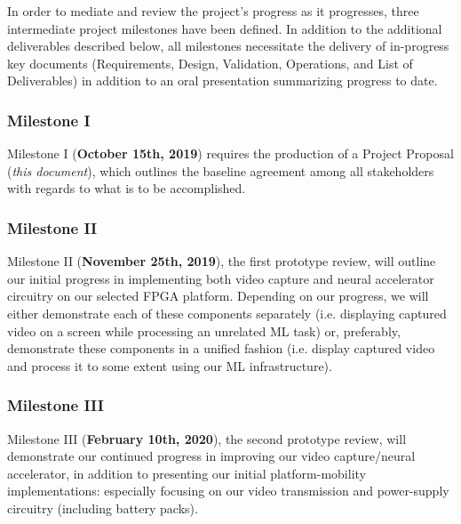 In order to mediate and review the project's progress as it progresses, three intermediate project milestones have been defined. In addition to the additional deliverables described below, all milestones necessitate the delivery of in-progress key documents (Requirements, Design, Validation, Operations, and List of Deliverables) in addition to an oral presentation summarizing progress to date.

\subsubsection{Milestone I}
Milestone I (\textbf{October 15th, 2019}) requires the production of a Project Proposal (\textit{this document}), which outlines the baseline agreement among all stakeholders with regards to what is to be accomplished. 

\subsubsection{Milestone II}
Milestone II (\textbf{November 25th, 2019}), the first prototype review, will outline our initial progress in implementing both video capture and neural accelerator circuitry on our selected FPGA platform. Depending on our progress, we will either demonstrate each of these components separately (i.e. displaying captured video on a screen while processing an unrelated ML task) or, preferably, demonstrate these components in a unified fashion (i.e. display captured video and process it to some extent using our ML infrastructure). 

\subsubsection{Milestone III}
Milestone III (\textbf{February 10th, 2020}), the second prototype review, will demonstrate our continued progress in improving our video capture/neural accelerator, in addition to presenting our initial platform-mobility implementations: especially focusing on our video transmission and power-supply circuitry (including battery packs). 